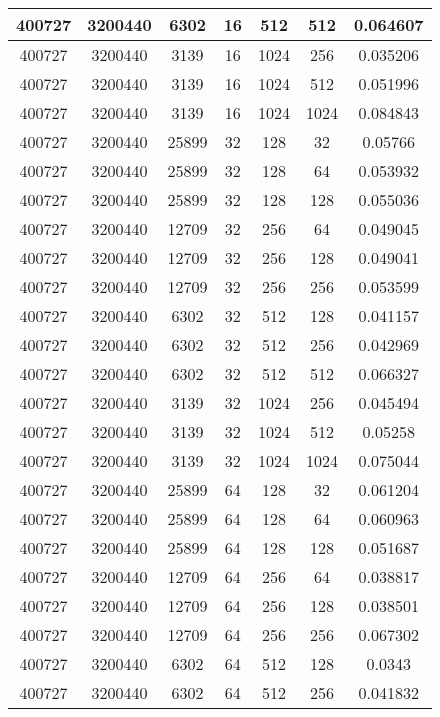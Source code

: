 \documentclass[9pt]{article}
\begin{document}
\begin{tabular}{|c|c|c|c|c|c|c| }
\hline
400727  & 3200440  & 6302  & 16  & 512  & 512  & 0.064607 \\
\hline
400727  & 3200440  & 3139  & 16  & 1024  & 256  & 0.035206 \\
\hline
400727  & 3200440  & 3139  & 16  & 1024  & 512  & 0.051996 \\
\hline
400727  & 3200440  & 3139  & 16  & 1024  & 1024  & 0.084843 \\
\hline
400727  & 3200440  & 25899  & 32  & 128  & 32  & 0.05766 \\
\hline
400727  & 3200440  & 25899  & 32  & 128  & 64  & 0.053932 \\
\hline
400727  & 3200440  & 25899  & 32  & 128  & 128  & 0.055036 \\
\hline
400727  & 3200440  & 12709  & 32  & 256  & 64  & 0.049045 \\
\hline
400727  & 3200440  & 12709  & 32  & 256  & 128  & 0.049041 \\
\hline
400727  & 3200440  & 12709  & 32  & 256  & 256  & 0.053599 \\
\hline
400727  & 3200440  & 6302  & 32  & 512  & 128  & 0.041157 \\
\hline
400727  & 3200440  & 6302  & 32  & 512  & 256  & 0.042969 \\
\hline
400727  & 3200440  & 6302  & 32  & 512  & 512  & 0.066327 \\
\hline
400727  & 3200440  & 3139  & 32  & 1024  & 256  & 0.045494 \\
\hline
400727  & 3200440  & 3139  & 32  & 1024  & 512  & 0.05258 \\
\hline
400727  & 3200440  & 3139  & 32  & 1024  & 1024  & 0.075044 \\
\hline
400727  & 3200440  & 25899  & 64  & 128  & 32  & 0.061204 \\
\hline
400727  & 3200440  & 25899  & 64  & 128  & 64  & 0.060963 \\
\hline
400727  & 3200440  & 25899  & 64  & 128  & 128  & 0.051687 \\
\hline
400727  & 3200440  & 12709  & 64  & 256  & 64  & 0.038817 \\
\hline
400727  & 3200440  & 12709  & 64  & 256  & 128  & 0.038501 \\
\hline
400727  & 3200440  & 12709  & 64  & 256  & 256  & 0.067302 \\
\hline
400727  & 3200440  & 6302  & 64  & 512  & 128  & 0.0343 \\
\hline
400727  & 3200440  & 6302  & 64  & 512  & 256  & 0.041832 \\

\end{tabular}
\end{document}
